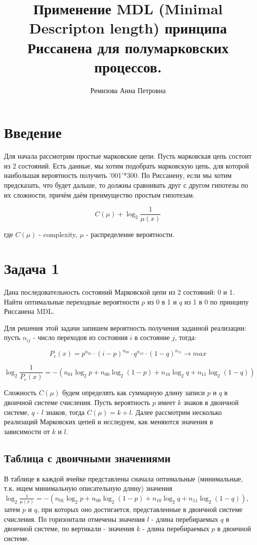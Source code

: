 \documentclass[12pt]{article}
\begin{document}
	\title{Применение MDL (Minimal Descripton length) принципа Риссанена для полумарковских процессов.}
	\author{Ремизова Анна Петровна}
	\maketitle
	
	\section*{Введение}
	Для начала рассмотрим простые марковские цепи. Пусть марковская цепь состоит из 2 состояний. Есть данные, мы хотим подобрать марковскую цепь, для которой наибольшая вероятность получить '001'*300. По Риссанену, если мы хотим предсказать, что будет дальше, то должны сравнивать друг с другом гипотезы по их сложности, причём даём преимущество простым гипотезам.
	
	$$C(\mu)+\log_2{\frac{1}{\mu(x)}}$$
	
	где $C(\mu)$ - complexity, $\mu$ - распределение вероятности.
	
	\section*{Задача 1}
	Дана последовательность состояний Марковской цепи из 2 состояний: 0 и 1. Найти оптимальные переходные вероятности $p$ из 0 в 1 и $q$ из 1 в 0 по принципу Риссанена MDL. 
	
	Для решения этой задачи запишем вероятность получения заданной реализации: пусть $n_{ij}$ - число переходов из состояния $i$ в состояние $j$, тогда:
	
	$$P_c(x) = p^{n_{01}}\cdot(i-p)^{n_{00}}\cdot q^{n_{10}}\cdot(1-q)^{n_{11}}\to max$$ 
	
	$$\log_2{\frac{1}{P_c(x)}}=-(n_{01}\log_2{p}+n_{00}\log_2{(1-p)}+n_{10}\log_2{q}+n_{11}\log_2{(1-q)})$$
	
	Сложность $C(\mu)$ будем определять как суммарную длину записи $p$ и $q$ в двоичной системе счисления. Пусть вероятность $p$ имеет $k$ знаков в двоичной системе, $q$ - $l$ знаков, тогда $C(\mu)=k+l$. Далее рассмотрим несколько реализаций Марковских цепей и исследуем, как меняются значения в зависимости от $k$ и $l$.
	
	\subsection*{Таблица с двоичными значениями}
	В таблице в каждой ячейке представлены сначала оптимальные (минимальные, т.к. ищем минимальную описательную длину) значения $\log_2{\frac{1}{\mu(x)}}=-(n_{01}\log_2{p}+n_{00}\log_2{(1-p)}+n_{10}\log_2{q}+n_{11}\log_2{(1-q)})$, затем $p$ и $q$, при которых оно достигается, представленные в двоичной системе счисления. По горизонтали отмечены значения $l$ - длина перебираемых $q$  в двоичной системе, по вертикали - значения $k$ - длина перебираемых $p$  в двоичной системе.
	
\end{document}

